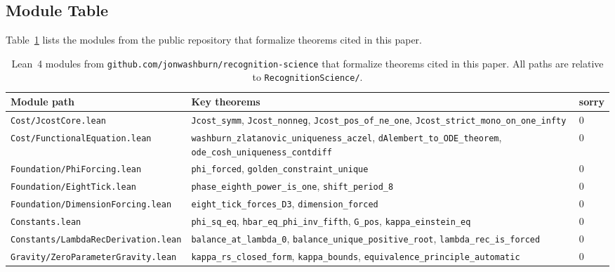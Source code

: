 \documentclass[12pt]{article}
\theoremstyle{definition}
\theoremstyle{remark}
\begin{document}
\subsection{Module Table}

Table~\ref{tab:lean} lists the modules from the public repository
\cite{WashburnLean4Repo2026} that formalize theorems cited in this
paper.

\begin{table}[ht]
\centering
\small
\begin{tabular}{@{}p{5.2cm}p{5.3cm}p{2cm}@{}}
\toprule
\textbf{Module path} & \textbf{Key theorems} & \textbf{sorry} \\
\midrule
\texttt{Cost/JcostCore.lean}
  & \texttt{Jcost\_symm},
    \texttt{Jcost\_nonneg},
    \texttt{Jcost\_pos\_of\_ne\_one},
    \texttt{Jcost\_strict\_mono\_\newline on\_one\_infty}
  & 0 \\[4pt]
\texttt{Cost/FunctionalEquation\newline .lean}
  & \texttt{washburn\_zlatanovic\_\newline uniqueness\_aczel},
    \texttt{dAlembert\_to\_ODE\_\newline theorem},
    \texttt{ode\_cosh\_uniqueness\_\newline contdiff}
  & 0 \\[4pt]
\texttt{Foundation/PhiForcing\newline .lean}
  & \texttt{phi\_forced},
    \texttt{golden\_constraint\_\newline unique}
  & 0 \\[4pt]
\texttt{Foundation/EightTick\newline .lean}
  & \texttt{phase\_eighth\_power\_\newline is\_one},
    \texttt{shift\_period\_8}
  & 0 \\[4pt]
\texttt{Foundation/Dimension\-Forcing.lean}
  & \texttt{eight\_tick\_forces\_D3},
    \texttt{dimension\_forced}
  & 0 \\[4pt]
\texttt{Constants.lean}
  & \texttt{phi\_sq\_eq},
    \texttt{hbar\_eq\_phi\_inv\_fifth},
    \texttt{G\_pos},
    \texttt{kappa\_einstein\_eq}
  & 0 \\[4pt]
\texttt{Constants/LambdaRec\-Derivation.lean}
  & \texttt{balance\_at\_lambda\_0},
    \texttt{balance\_unique\_\newline positive\_root},
    \texttt{lambda\_rec\_is\_forced}
  & 0 \\[4pt]
\texttt{Gravity/ZeroParameter\-Gravity.lean}
  & \texttt{kappa\_rs\_closed\_form},
    \texttt{kappa\_bounds},
    \texttt{equivalence\_principle\_\newline automatic}
  & 0 \\
\bottomrule
\end{tabular}
\caption{Lean~4 modules from
\texttt{github.com/jonwashburn/recognition-science}
that formalize theorems cited in this paper.
All paths are relative to \texttt{RecognitionScience/}.}
\label{tab:lean}
\end{table}
\end{document}
